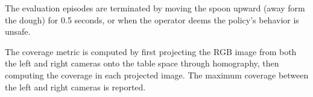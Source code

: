 The evaluation episodes are terminated by moving the spoon upward (away form the dough) for 0.5 seconds, or when the operator deems the policy's behavior is unsafe.

The coverage metric is computed by first projecting the RGB image from both the left and right cameras onto the table space through homography, then computing the coverage in each projected image. The maximum coverage between the left and right cameras is reported.



